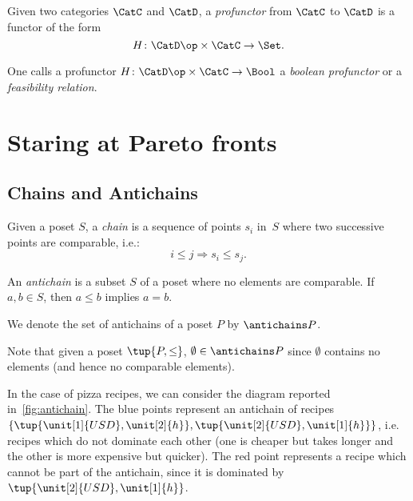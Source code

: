 \begin{shaded}
\begin{definition}[Profunctor]
\label{def:profunctor}
Given two categories $\CatC$ and $\CatD$, a \emph{profunctor} from $\CatC$ to $\CatD$ is a functor of the form
\begin{equation}
    H\colon \CatD\op \times \CatC \to \Set.
\end{equation}
\end{definition}
\begin{remark}
One calls a profunctor $H\colon \CatD\op \times \CatC \to \Bool$ a \emph{boolean profunctor} or a \emph{feasibility relation}.
\end{remark}
\end{shaded}




\clearpage
\section{Staring at Pareto fronts}

\subsection{Chains and Antichains} \label{sec:chains-antichains}


\begin{definition}
\label{def:chain}
Given a poset $S$, a \emph{chain} is a sequence of points ${s_i}$ in~$S$ where two successive points are comparable, i.e.:
\begin{equation}
    i \leq j \Rightarrow s_i \leq s_j.
\end{equation}
\end{definition}

 
\begin{definition}
\label{def:antichain}
An \emph{antichain} is a subset $S$ of a poset where no elements are comparable. If $a,b \in S$, then $a \leq b$ implies $a=b$.
\end{definition}
\begin{remark}
We denote the set of antichains of a poset $P$ by $\antichains P$.
\end{remark}
\begin{remark}
Note that given a poset $\tup{P,\leq}$, $\emptyset \in \antichains P$ since $\emptyset$ contains no elements (and hence no comparable elements).
\end{remark}

In the case of pizza recipes, we can consider the diagram reported in~\cref{fig:antichain}. The blue points represent an antichain of recipes $\{\tup{\unit[1]{USD},\unit[2]{h}},\tup{\unit[2]{USD},\unit[1]{h}}\}$, i.e. recipes which do not dominate each other (one is cheaper but takes longer and the other is more expensive but quicker). The red point represents a recipe which cannot be part of the antichain, since it is dominated by $\tup{\unit[2]{USD},\unit[1]{h}}$. 

